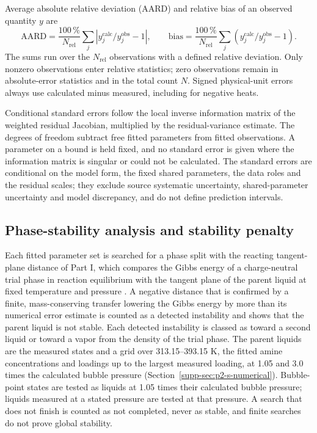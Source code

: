 Average absolute relative deviation (AARD) and relative bias of an observed quantity $y$ are
\begin{equation}
 \mathrm{AARD}=\frac{100\,\%}{N_{\mathrm{rel}}}\sum_j|y_j^{\mathrm{calc}}/y_j^{\mathrm{obs}}-1|,\qquad
 \mathrm{bias}=\frac{100\,\%}{N_{\mathrm{rel}}}\sum_j(y_j^{\mathrm{calc}}/y_j^{\mathrm{obs}}-1).
 \label{eq:p2-deviation}
\end{equation}
The sums run over the $N_{\mathrm{rel}}$ observations with a defined relative deviation.
Only nonzero observations enter relative statistics; zero observations remain in absolute-error statistics and in the total count $N$.
Signed physical-unit errors always use calculated minus measured, including for negative heats.

Conditional standard errors follow the local inverse information matrix of the weighted residual Jacobian, multiplied by the residual-variance estimate.
The degrees of freedom subtract free fitted parameters from fitted observations.
A parameter on a bound is held fixed, and no standard error is given where the information matrix is singular or could not be calculated.
The standard errors are conditional on the model form, the fixed shared parameters, the data roles and the residual scales; they exclude source systematic uncertainty, shared-parameter uncertainty and model discrepancy, and do not define prediction intervals.

\subsection{Phase-stability analysis and stability penalty}\label{sec:p2-search}
Each fitted parameter set is searched for a phase split with the reacting tangent-plane distance of Part I, which compares the Gibbs energy of a charge-neutral trial phase in reaction equilibrium with the tangent plane of the parent liquid at fixed temperature and pressure \cite[Sect.~3.4]{PolleyPartI}.
A negative distance that is confirmed by a finite, mass-conserving transfer lowering the Gibbs energy by more than its numerical error estimate is counted as a detected instability and shows that the parent liquid is not stable.
Each detected instability is classed as toward a second liquid or toward a vapor from the density of the trial phase.
The parent liquids are the measured states and a grid over 313.15--393.15 K, the fitted amine concentrations and loadings up to the largest measured loading, at 1.05 and 3.0 times the calculated bubble pressure (Section~\ref{supp-sec:p2-s-numerical}).
Bubble-point states are tested as liquids at 1.05 times their calculated bubble pressure; liquids measured at a stated pressure are tested at that pressure.
A search that does not finish is counted as not completed, never as stable, and finite searches do not prove global stability.

